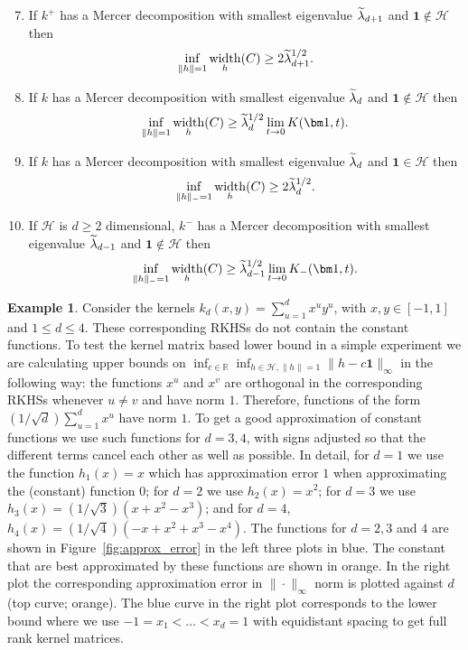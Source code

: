 \documentclass[10pt]{amsart}
\theoremstyle{definition}\newtheorem{defi}[theo]{Definition}\newtheorem{rema}[theo]{Remark}\newtheorem{exam}[theo]{Example}\newtheorem{exem}[theo]{Example}\newtheorem{nota}[theo]{Notation}
\theoremstyle{remark}
\DeclareMathOperator{\diam}{width}
\newcommand{\R}{\mathbb{R}}
\newcommand{\cH}{\mathcal{H}}
\let\oldtilde\tilde
\renewcommand*{\tilde}[1]{\mathchoice{\widetilde{#1}}{\widetilde{#1}}{\oldtilde{#1}}{\oldtilde{#1}}}
\renewcommand*{\to}{\mathchoice{\longrightarrow}{\rightarrow}{\rightarrow}{\rightarrow}}
\begin{document}
\begin{prop}
\begin{enumerate}
\setcounter{enumi}{6}
\item\label{prop2.10.7} If $k^+$ has a Mercer decomposition with smallest eigenvalue $\tilde \lambda_{d+1}$ and $\bm 1 \not \in \cH$ then
\[
\inf_{\|h\| = 1} \diam_h(C) \geq 2 \tilde \lambda_{d+1}^{1/2}.
\]
\item\label{prop2.10.8} If $k$ has a Mercer decomposition with smallest eigenvalue $\tilde \lambda_d$ and $\bm 1 \not \in \cH$ then
\[
\inf_{\|h\| = 1} \diam_h(C) \geq \tilde \lambda_d^{1/2} \lim_{t\to 0} K(\bm 1,t).
\]
\item\label{prop2.10.9} If $k$ has a Mercer decomposition with smallest eigenvalue $\tilde \lambda_{d}$ and $\bm 1 \in \cH$ then
\[
\inf_{\|h\|_- = 1} \diam_h(C) \geq 2 \tilde \lambda_{d}^{1/2}.
\]
\item\label{prop2.10.10} If $\cH$ is $d\geq 2$ dimensional, $k^-$ has a Mercer decomposition with smallest eigenvalue $\tilde \lambda_{d-1}$ and $\bm 1 \not \in \cH$ then
\[
\inf_{\|h\|_- = 1} \diam_h(C) \geq \tilde \lambda_{d-1}^{1/2} \lim_{t\to 0} K_-(\bm 1,t).
\]
\end{enumerate}
\end{prop}



\begin{exam}
Consider the kernels $k_d(x,y) = \sum_{u=1}^d x^u y^u$, with $x,y \in [-1,1]$ and $1 \leq d \leq 4$. These corresponding RKHSs do not contain the constant functions. To test the kernel matrix based lower bound in a simple experiment we are calculating upper bounds on $\inf_{c\in \R} \inf_{h \in \cH, \|h\|=1} \|h - c \bm 1\|_\infty$ in the following way: the functions $x^u$ and $x^v$ are orthogonal in the corresponding RKHSs whenever $u\not = v$ and have norm $1$. Therefore, functions of the form $(1/\sqrt{d})\sum_{u=1}^d x^u$ have norm $1$. To get a good approximation of constant functions we use such functions for $d=3,4$, with signs adjusted so that the different terms cancel each other as well as possible. In detail, for $d=1$ we use the function $h_1(x) = x$ which has approximation error $1$ when approximating the (constant) function $0$; for $d=2$ we use $h_2(x) = x^2$; for $d=3$ we use $h_3(x) = (1/\sqrt{3}) (x + x^2 - x^3)$; and for $d=4$, $h_4(x) = (1/\sqrt{4}) (-x + x^2 + x^3 - x^4)$. The functions for $d=2,3$ and $4$ are shown in Figure~\ref{fig:approx_error} in the left three plots in blue. The constant that are best approximated by these functions are shown in orange. In the right plot the corresponding approximation error in $\|\cdot\|_\infty$ norm is plotted against $d$ (top curve; orange). The blue curve in the right plot corresponds to the lower bound where we use $-1 = x_1 < \dots < x_d =1$ with equidistant spacing to get full rank kernel matrices.
\end{exam}
\end{document}
